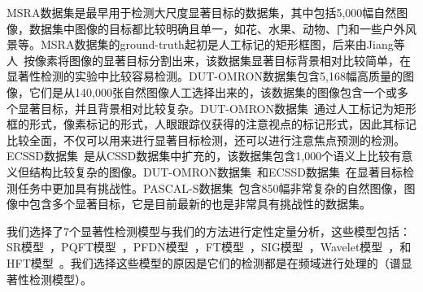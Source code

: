 MSRA数据集是最早用于检测大尺度显著目标的数据集，其中包括5,000幅自然图像，数据集中图像的目标都比较明确且单一，如花、水果、动物、门和一些户外风景等。MSRA数据集的ground-truth起初是人工标记的矩形框图，后来由Jiang等人~\cite{JiangHuaizuCVPR2013Discriminative}按像素将图像的显著目标分割出来，该数据集显著目标背景相对比较简单，在显著性检测的实验中比较容易检测。DUT-OMRON数据集\cite{YangChuanCVPR2013Manifold}包含5,168幅高质量的图像，它们是从140,000张自然图像人工选择出来的，该数据集的图像包含一个或多个显著目标，并且背景相对比较复杂。DUT-OMRON数据集~\cite{YangChuanCVPR2013Manifold}通过人工标记为矩形框的形式，像素标记的形式，人眼跟踪仪获得的注意视点的标记形式，因此其标记比较全面，不仅可以用来进行显著目标检测，还可以进行注意焦点预测的检测。ECSSD数据集~\cite{YanQiongCVPR2013Hierarchical}是从CSSD数据集中扩充的，该数据集包含1,000个语义上比较有意义但结构比较复杂的图像。DUT-OMRON数据集~\cite{YangChuanCVPR2013Manifold}和ECSSD数据集~\cite{YanQiongCVPR2013Hierarchical}在显著目标检测任务中更加具有挑战性。PASCAL-S数据集~\cite{LiYinCVPR2014Secrets}包含850幅非常复杂的自然图像，图像中包含多个显著目标，它是目前最新的也是非常具有挑战性的数据集。

我们选择了7个显著性检测模型与我们的方法进行定性定量分析，这些模型包括：SR模型~\cite{HouXiaodiCVPR2007Residual}，PQFT模型~\cite{GuoChenleiCVPR2008Spatio}，PFDN模型~\cite{BianCognNeurodyn2010Visual}，FT模型~\cite{AchantaCVPR2009Frequency}，SIG模型~\cite{HouXiaodiTPAMI2012Signature}，Wavelet模型~\cite{ImamogluTMM2013wavelet}，和HFT模型~\cite{LiJianTPAMI2013Scale}。我们选择这些模型的原因是它们的检测都是在频域进行处理的（谱显著性检测模型）。

